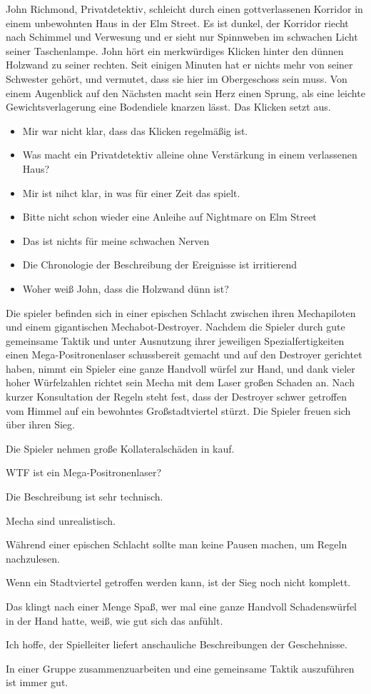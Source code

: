 \documentclass{article}
\begin{document}
John Richmond, Privatdetektiv, schleicht durch einen gottverlassenen Korridor in einem unbewohnten Haus in der Elm Street.
Es ist dunkel, der Korridor riecht nach Schimmel und Verwesung und er sieht nur Spinnweben im schwachen Licht seiner Taschenlampe.
John hört ein merkwürdiges Klicken hinter den dünnen Holzwand zu seiner rechten.
Seit einigen Minuten hat er nichts mehr von seiner Schwester gehört, und vermutet, dass sie hier im Obergeschoss sein muss.
Von einem Augenblick auf den Nächsten macht sein Herz einen Sprung, als eine leichte Gewichtsverlagerung eine Bodendiele knarzen lässt.
Das Klicken setzt aus.
\begin{itemize}
\item Mir war nicht klar, dass das Klicken regelmäßig ist.
\item Was macht ein Privatdetektiv alleine ohne Verstärkung in einem verlassenen Haus?
\item Mir ist nihct klar, in was für einer Zeit das spielt.
\item Bitte nicht schon wieder eine Anleihe auf Nightmare on Elm Street
\item Das ist nichts für meine schwachen Nerven
\item Die Chronologie der Beschreibung der Ereignisse ist irritierend
\item Woher weiß John, dass die Holzwand dünn ist?
\end{itemize}

Die spieler befinden sich in einer epischen Schlacht zwischen ihren Mechapiloten und einem gigantischen Mechabot-Destroyer.
Nachdem die Spieler durch gute gemeinsame Taktik und unter Ausnutzung ihrer jeweiligen Spezialfertigkeiten einen Mega-Positronenlaser schussbereit gemacht und auf den Destroyer gerichtet haben,
nimmt ein Spieler eine ganze Handvoll würfel zur Hand, und dank vieler hoher Würfelzahlen richtet sein Mecha mit dem Laser großen Schaden an.
Nach kurzer Konsultation der Regeln steht fest, dass der Destroyer schwer getroffen vom Himmel auf ein bewohntes Großstadtviertel stürzt.
Die Spieler freuen sich über ihren Sieg.

\item Die Spieler nehmen große Kollateralschäden in kauf.
\item WTF ist ein Mega-Positronenlaser?
\item Die Beschreibung ist sehr technisch.
\item Mecha sind unrealistisch.
\item Während einer epischen Schlacht sollte man keine Pausen machen, um Regeln nachzulesen.
\item Wenn ein Stadtviertel getroffen werden kann, ist der Sieg noch nicht komplett.
\item Das klingt nach einer Menge Spaß, wer mal eine ganze Handvoll Schadenswürfel in der Hand hatte, weiß, wie gut sich das anfühlt.
\item Ich hoffe, der Spielleiter liefert anschauliche Beschreibungen der Geschehnisse.
\item In einer Gruppe zusammenzuarbeiten und eine gemeinsame Taktik auszuführen ist immer gut.
\end{document}
